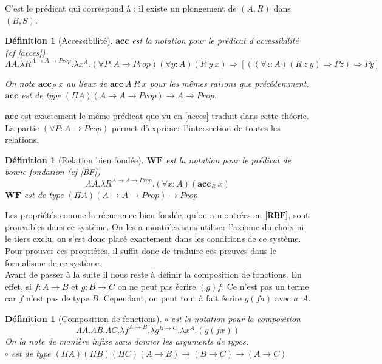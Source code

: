 \documentclass[a4paper,12pt]{article}
\theoremstyle{plain}
\newtheorem{defi}[theo]{Définition}
\begin{document}
C'est le prédicat qui correspond à : il existe un plongement de $(A,R)$ dans $(B,S)$.

\begin{defi}[Accessibilité]
$\mathbf{acc}$ est la notation pour le prédicat d'accessibilité (cf \ref{acces})
$$ \Lambda A. \lambda R^{A \to A \to \mathit{Prop}}. \lambda x^A.(\forall P : A \to \mathit{Prop})(\forall y : A)(R \ y \ x) \Rightarrow[((\forall z :A) (R\ z \ y) \Rightarrow Pz) \Rightarrow Py]$$


On note $\mathbf{acc}_R \ x$ au lieux de $\mathbf{acc}\ A \ R \ x$ pour les mêmes raisons que précédemment. $\mathbf{acc}$ est de type $(\Pi A)( A \to A \to \mathit{Prop}) \to A \to \mathit{Prop}$. 
\end{defi}

$\mathbf{acc}$ est exactement le même prédicat que vu en \ref{acces} traduit dans cette théorie. La partie $(\forall P : A \to \mathit{Prop})$ permet d'exprimer l'intersection de toutes les relations.

\begin{defi}[Relation bien fondée]
$\mathbf{WF}$ est la notation pour le prédicat de bonne fondation (cf \ref{BF})
$$ \Lambda A. \lambda R^{A \to A \to \mathit{Prop}}. (\forall x:A) (\mathbf{acc}_R \ x)$$
$\mathbf{WF}$ est de type $(\Pi A)( A \to A \to \mathit{Prop}) \to \mathit{Prop}$
\end{defi}

Les propriétés comme la récurrence bien fondée, qu'on a montrées en $\ref{RBF}$, sont prouvables dans ce système. On les a montrées sans utiliser l'axiome du choix ni le tiers exclu, on s'est donc placé exactement dans les conditions de ce système. Pour prouver ces propriétés, il suffit donc de traduire ces preuves dans le formalisme de ce système.\\

Avant de passer à la suite il nous reste à définir la composition de fonctions. En effet, si $f: A \to B$ et $g : B \to C$ on ne peut pas écrire $(g)f$. Ce n'est pas un terme car $f$ n'est pas de type $B$. Cependant, on peut tout à fait écrire $g(fa)$ avec $a : A$.

\begin{defi}[Composition de fonctions]
$\circ$ est la notation pour la composition
$$\Lambda A. \Lambda B. \Lambda C. \lambda f^{A \to B}. \lambda g^{B \to C}.\lambda x^A.(g(fx))$$
On la note de manière infixe sans donner les arguments de types.\\
 $\circ$ est de type $(\Pi A)(\Pi B)(\Pi C)(A\to B) \to (B \to C) \to (A \to C)$
\end{defi}
\end{document}
